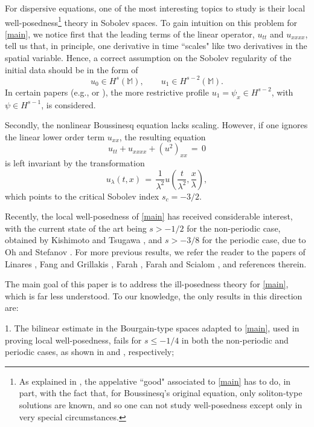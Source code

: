 \documentclass{amsart}
\begin{document}
For dispersive equations, one of the most interesting topics to study is their local well-posedness\footnote{As explained in \cite{L93}, the appelative ``good" associated to \eqref{main} has to do, in part, with the fact that, for Boussinesq's original equation, only soliton-type solutions are known, and so one can not study well-posedness except only in very special circumstances.} theory in Sobolev spaces. To gain intuition on this problem for  \eqref{main}, we notice first that the leading terms of the linear operator, $u_{tt}$ and $u_{xxxx}$, tell us that, in principle, one derivative in time ``scales" like two derivatives in the spatial variable. Hence, a correct assumption on the Sobolev regularity of the 
initial data should be in the form of  
\begin{equation}
u_0 \in H^s(\mathbb{M}), \qquad u_1 \in H^{s-2}(\mathbb{M}).
\label{not}
\end{equation}
In certain papers (e.g., \cite{F09} or \cite{FS10}), the more restrictive profile $u_1=\psi_x \in H^{s-2}$, with $\psi \in H^{s-1}$, is considered.

Secondly, the nonlinear Boussinesq equation lacks scaling. However, if one ignores the linear lower order term $u_{xx}$, the resulting equation 
\begin{equation}
u_{tt}+u_{xxxx}+(u^2)_{xx}\,=\,0\label{new}
\end{equation}
is left invariant by the transformation
\[
u_{\lambda}(t,x)\,=\,\frac{1}{\lambda^2}u\left(\frac{t}{\lambda^2}, \frac{x}{\lambda}\right),
\]
which points to the critical Sobolev index $s_c=-3/2$.

Recently, the local well-posedness of \eqref{main} has received considerable interest, with the current state of the art being $s>-1/2$ for the non-periodic case, obtained by Kishimoto and Tsugawa \cite{KT10}, and $s>-3/8$ for the periodic case, due to Oh and Stefanov \cite{OS12}. For more previous results, we refer the reader to the papers of Linares \cite{L93}, Fang and Grillakis \cite{FG96}, Farah \cite{F09}, Farah and Scialom \cite{FS10}, and references therein.

The main goal of this paper is to address the ill-posedness theory for \eqref{main}, which is far less understood. To our knowledge, the only results in this direction are:

1. The bilinear estimate in the Bourgain-type spaces adapted to \eqref{main}, used in proving local well-posedness, fails for $s\leq -1/4$ in both the non-periodic and periodic cases, as shown in  \cite{F09} and \cite{FS10}, respectively;
\end{document}
